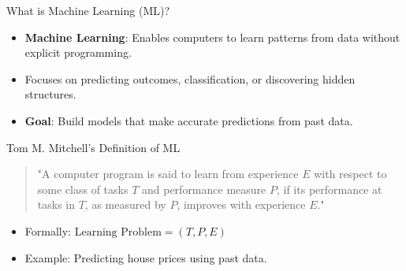 \documentclass[serif, aspectratio=169]{beamer}
\begin{document}
\begin{frame}{What is Machine Learning (ML)?}
    \begin{itemize}
        \item \textbf{Machine Learning}: Enables computers to learn patterns from data without explicit programming.
        \item Focuses on predicting outcomes, classification, or discovering hidden structures.
    \vspace{4mm}

        \item \textbf{Goal}: Build models that make accurate predictions from past data.
    \end{itemize}
\end{frame}



\begin{frame}{Tom M. Mitchell's Definition of ML}
    \begin{quote}
    "A computer program is said to learn from experience $E$ with respect to some class of tasks $T$ and performance measure $P$, if its performance at tasks in $T$, as measured by $P$, improves with experience $E$."
    \end{quote}
    \vspace{2mm}
    \begin{itemize}
        \item Formally: $\text{Learning Problem} = (T, P, E)$
        \item Example: Predicting house prices using past data.
    \end{itemize}
\end{frame}
\end{document}
